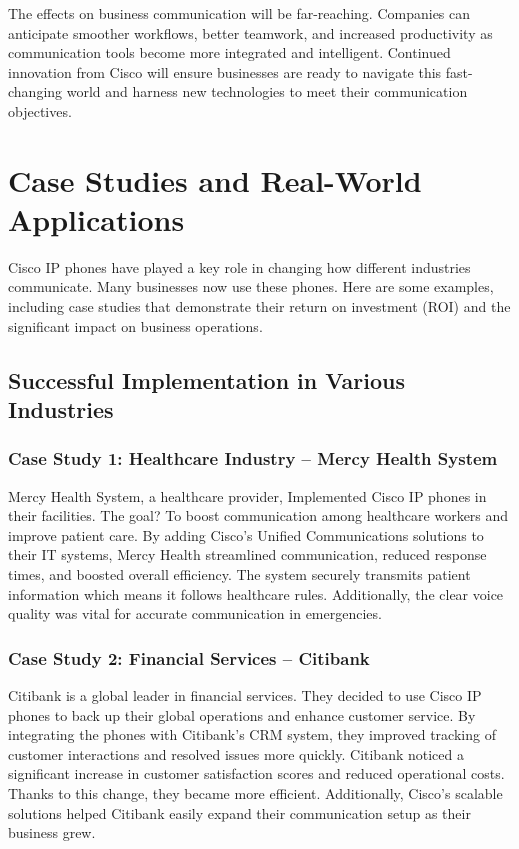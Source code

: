 \documentclass[11pt,a4paper]{article}
\begin{document}
The effects on business communication will be far-reaching. Companies can anticipate smoother workflows, better teamwork, and increased productivity as communication tools become more integrated and intelligent. Continued innovation from Cisco will ensure businesses are ready to navigate this fast-changing world and harness new technologies to meet their communication objectives.


\section*{Case Studies and Real-World Applications}

Cisco IP phones have played a key role in changing how different industries communicate. Many businesses now use these phones. Here are some examples, including case studies that demonstrate their return on investment (ROI) and the significant impact on business operations.


\subsection*{Successful Implementation in Various Industries}

\subsubsection*{Case Study 1: Healthcare Industry – Mercy Health System}

Mercy Health System, a healthcare provider, Implemented Cisco IP phones in their facilities. The goal? To boost communication among healthcare workers and improve patient care. By adding Cisco’s Unified Communications solutions to their IT systems, Mercy Health streamlined communication, reduced response times, and boosted overall efficiency. The system securely transmits patient information which means it follows healthcare rules. Additionally, the clear voice quality was vital for accurate communication in emergencies.


\subsubsection*{Case Study 2: Financial Services – Citibank}

Citibank is a global leader in financial services. They decided to use Cisco IP phones to back up their global operations and enhance customer service. By integrating the phones with Citibank’s CRM system, they improved tracking of customer interactions and resolved issues more quickly. Citibank noticed a significant increase in customer satisfaction scores and reduced operational costs. Thanks to this change, they became more efficient. Additionally, Cisco’s scalable solutions helped Citibank easily expand their communication setup as their business grew.
\end{document}
